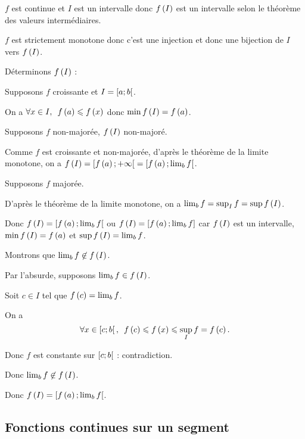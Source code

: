 \begin{dem}[Cas où \(f\) est croissante et \(I=\intervie{a}{b}\)]
\(f\) est continue et \(I\) est un intervalle donc \(f\left(I\right)\) est un intervalle selon le théorème des valeurs intermédiaires.

\(f\) est strictement monotone donc c'est une injection et donc une bijection de \(I\) vers \(f\left(I\right)\).

Déterminons \(f\left(I\right)\) :

Supposons \(f\) croissante et \(I=\intervie{a}{b}\).

On a \(\quantifs{\forall x\in I}f\paren{a}\leq f\paren{x}\) donc \(\min f\left(I\right)=f\left(a\right)\).

Supposons \(f\) non-majorée, \cad \(f\left(I\right)\) non-majoré.

Comme \(f\) est croissante et non-majorée, d'après le théorème de la limite monotone, on a \(f\left(I\right)=\left[f\left(a\right);+\infty\right[=\left[f\left(a\right);\lim_bf\right[\).

Supposons \(f\) majorée.

D'après le théorème de la limite monotone, on a \(\lim_bf=\sup_If=\sup f\left(I\right)\).

Donc \(f\left(I\right)=\left[f\left(a\right);\lim_bf\right[\) ou \(f\left(I\right)=\left[f\left(a\right);\lim_bf\right]\) car \(f\left(I\right)\) est un intervalle, \(\min f\left(I\right)=f\left(a\right)\) et \(\sup f\left(I\right)=\lim_bf\).

Montrons que \(\lim_bf\not\in f\left(I\right)\).

Par l'absurde, supposons \(\lim_bf\in f\left(I\right)\).

Soit \(c\in I\) tel que \(f\left(c\right)=\lim_bf\).

On a \[\quantifs{\forall x\in\intervie{c}{b}}f\paren{c}\leq f\paren{x}\leq\sup_If=f\paren{c}.\]

Donc \(f\) est constante sur \(\left[c;b\right[\) : contradiction.

Donc \(\lim_bf\not\in f\left(I\right)\).

Donc \(f\left(I\right)=\left[f\left(a\right);\lim_bf\right[\).
\end{dem}

\begin{dem}
\end{dem}

\subsection{Fonctions continues sur un segment}

